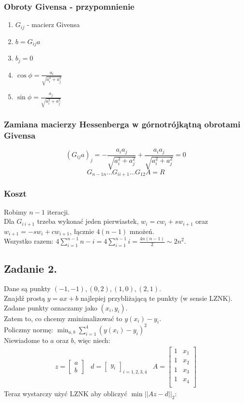 \documentclass{article}
\begin{document}
\subsubsection{Obroty Givensa - przypomnienie}
\begin{enumerate}
	\item $ G_{ij} $ - macierz Givensa
	\item $ b=G_{ij}a$
	\item $ b_j=0 $
	\item $ \cos\phi = \frac{a_i}{\sqrt{a_i^2+a_j^2}} $
	\item $ \sin\phi = \frac{a_j}{\sqrt{a_i^2+a_j^2}} $
\end{enumerate}

\subsubsection{Zamiana macierzy Hessenberga w górnotrójkątną obrotami Givensa}
$$ (G_{ij}a)_j = -\frac{a_ia_j}{\sqrt{a_i^2 + a_j^2}}+\frac{a_ia_j}{\sqrt{a_i^2 + a_j^2}}=0$$
$$G_{n-1 n}\ldots G_{i i+1}\ldots G_{12}A=R$$
\subsubsection{Koszt}
Robimy $ n-1 $ iteracji.\\
Dla $ G_{i\ i+1} $ trzeba wykonać jeden pierwiastek, $ w_i =cw_i+sw_{i+1}$ oraz $w_{i+1} = -sw_i + cw_{i+1}$, łącznie $4(n-1) $ mnożeń.\\
Wszystko razem: $4\sum_{i=1}^{n-1}n-i=4\sum_{i=1}^{n-1}i=\frac{4n(n-1)}{2}\sim2n^2$.
\subsection{Zadanie 2.}
Dane są punkty $(-1, -1), (0,2), (1, 0), (2, 1)$.\\
Znajdź prostą $ y=ax+b $ najlepiej przybliżającą te punkty (w sensie LZNK).\\
Zadane punkty oznaczamy jako $ (x_i, y_i) $.\\
Zatem to, co chcemy zminimalizować to $y(x_i)-y_i$.\\
Policzmy normę: $ \min_{a, b} \sum_{i=1}^{4}(y(x_i)-y_i)^2$\\
Niewiadome to $ a $ oraz $ b $, więc niech:
$$
\begin{matrix}
	z=\begin{bmatrix}a\\b\end{bmatrix}&
	d=\begin{bmatrix}y_i\end{bmatrix}_{i=1, 2, 3, 4}&
	A=\begin{bmatrix}
		1&x_1\\
		1&x_2\\
		1&x_3\\
		1&x_4\\
	\end{bmatrix}
\end{matrix}
$$
Teraz wystarczy użyć LZNK aby obliczyć $\min{||Az-d||_2}$:
\end{document}
